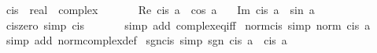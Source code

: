 \begin{isabellebody}
%
\endisadelimproof
%
\isadelimdocument
%
\endisadelimdocument
%
\isatagdocument
%
\isamarkuptrue%
%
\endisatagdocument
{\isafolddocument}%
%
\isadelimdocument
%
\endisadelimdocument
{}\isamarkupfalse%
\ cis\ {\isacharcolon}{\kern0pt}{\isacharcolon}{\kern0pt}\ {\isachardoublequoteopen}real\ {\isasymRightarrow}\ complex{\isachardoublequoteclose}\isanewline
\ \ \isanewline
\ \ \ \ {\isachardoublequoteopen}Re\ {\isacharparenleft}{\kern0pt}cis\ a{\isacharparenright}{\kern0pt}\ {\isacharequal}{\kern0pt}\ cos\ a{\isachardoublequoteclose}\isanewline
\ \ {\isacharbar}{\kern0pt}\ {\isachardoublequoteopen}Im\ {\isacharparenleft}{\kern0pt}cis\ a{\isacharparenright}{\kern0pt}\ {\isacharequal}{\kern0pt}\ sin\ a{\isachardoublequoteclose}\isanewline
\isanewline
{}\isamarkupfalse%
\ cis{\isacharunderscore}{\kern0pt}zero\ {\isacharbrackleft}{\kern0pt}simp{\isacharbrackright}{\kern0pt}{\isacharcolon}{\kern0pt}\ {\isachardoublequoteopen}cis\ {}\ {\isacharequal}{\kern0pt}\ {}{\isachardoublequoteclose}\isanewline
%
\isadelimproof
\ \ %
\endisadelimproof
%
\isatagproof
{}\isamarkupfalse%
\ {\isacharparenleft}{\kern0pt}simp\ add{\isacharcolon}{\kern0pt}\ complex{\isacharunderscore}{\kern0pt}eq{\isacharunderscore}{\kern0pt}iff{\isacharparenright}{\kern0pt}%
\endisatagproof
{\isafoldproof}%
%
\isadelimproof
\isanewline
%
\endisadelimproof
\isanewline
{}\isamarkupfalse%
\ norm{\isacharunderscore}{\kern0pt}cis\ {\isacharbrackleft}{\kern0pt}simp{\isacharbrackright}{\kern0pt}{\isacharcolon}{\kern0pt}\ {\isachardoublequoteopen}norm\ {\isacharparenleft}{\kern0pt}cis\ a{\isacharparenright}{\kern0pt}\ {\isacharequal}{\kern0pt}\ {}{\isachardoublequoteclose}\isanewline
%
\isadelimproof
\ \ %
\endisadelimproof
%
\isatagproof
{}\isamarkupfalse%
\ {\isacharparenleft}{\kern0pt}simp\ add{\isacharcolon}{\kern0pt}\ norm{\isacharunderscore}{\kern0pt}complex{\isacharunderscore}{\kern0pt}def{\isacharparenright}{\kern0pt}%
\endisatagproof
{\isafoldproof}%
%
\isadelimproof
\isanewline
%
\endisadelimproof
\isanewline
{}\isamarkupfalse%
\ sgn{\isacharunderscore}{\kern0pt}cis\ {\isacharbrackleft}{\kern0pt}simp{\isacharbrackright}{\kern0pt}{\isacharcolon}{\kern0pt}\ {\isachardoublequoteopen}sgn\ {\isacharparenleft}{\kern0pt}cis\ a{\isacharparenright}{\kern0pt}\ {\isacharequal}{\kern0pt}\ cis\ a{\isachardoublequoteclose}\isanewline
%
\isadelimproof
\ \ %
\endisadelimproof
%
\isatagproof
{}\isamarkupfalse%

\end{isabellebody}
